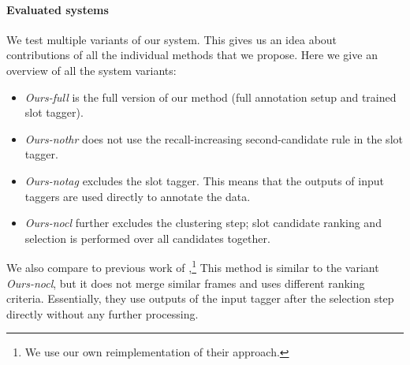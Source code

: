\paragraph{Evaluated systems}
We test multiple variants of our system.
This gives us an idea about contributions of all the individual methods that we propose.
Here we give an overview of all the system variants:
\begin{itemize}[nosep,leftmargin=10pt]
    \item \textit{Ours-full} is the full version of our method (full annotation setup and trained slot tagger).
    \item \textit{Ours-nothr} does not use the recall-increasing second-candidate rule in the slot tagger.
    \item \textit{Ours-notag} excludes the slot tagger. This means that the outputs of input taggers are used directly to annotate the data.
    \item \textit{Ours-nocl} further excludes the clustering step; slot candidate ranking and selection is performed over all candidates together.
\end{itemize}
We also compare to previous work of \citet{chen2014leveraging},\footnote{We use our own reimplementation of their approach.}
This method is similar to the variant \textit{Ours-nocl}, but it does not merge similar frames and uses different ranking criteria.
Essentially, they use outputs of the input tagger after the selection step directly without any further processing.

